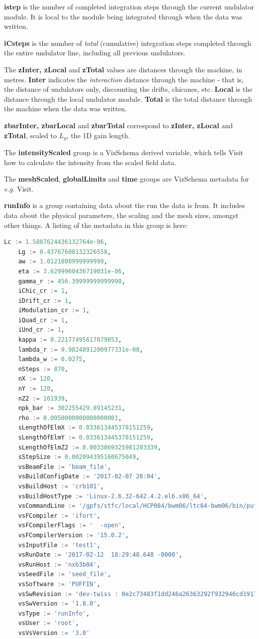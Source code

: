 \documentclass[12pt]{article}%
\begin{document}
{\bf istep} is the number of completed integration steps through the current undulator module. It is local to the module being integrated through when the data was written.

{\bf iCsteps} is the number of \textit{total} (cumulative) integration steps completed through the entire undulator line, including all previous undulators.

The {\bf zInter, zLocal} and {\bf zTotal} values are distances through the machine, in metres. {\bf Inter} indicates the \textit{interaction} distance through the machine - that is, the distance of undulators only, discounting the drifts, chicanes, etc. {\bf Local} is the distance through the local undulator module. {\bf Total} is the total distance through the machine when the data was written.

{\bf zbarInter, zbarLocal} and {\bf zbarTotal} correspond to {\bf zInter, zLocal} and {\bf zTotal}, scaled to $L_g$, the 1D gain length.


The {\bf intensityScaled} group is a VizSchema derived variable, which tells Visit how to calculate the intensity from the scaled field data.

The {\bf meshScaled}, {\bf globalLimits} and {\bf time} groups are VizSchema metadata for \textit{e.g.} Visit.

{\bf runInfo} is a group containing data about the run the data is from. It includes data about the physical parameters, the scaling and the mesh sizes, amongst other things. A listing of the metadata in this group is here:

\begin{lstlisting}[language=python]
    Lc := 1.5887624436132764e-06,
    Lg := 0.43767608132326558,
    aw := 1.0121808999999999,
    eta := 3.6299960436719031e-06,
    gamma_r := 456.39999999999998,
    iChic_cr := 1,
    iDrift_cr := 1,
    iModulation_cr := 1,
    iQuad_cr := 1,
    iUnd_cr := 1,
    kappa := 0.22177495617879053,
    lambda_r := 9.9824891200977331e-08,
    lambda_w := 0.0275,
    nSteps := 870,
    nX := 120,
    nY := 120,
    nZ2 := 161939,
    npk_bar := 302255429.89145231,
    rho := 0.0050000000000000001,
    sLengthOfElmX := 0.033613445378151259,
    sLengthOfElmY := 0.033613445378151259,
    sLengthOfElmZ2 := 0.0033069325981203339,
    sStepSize := 0.002094395160675049,
    vsBeamFile := 'beam_file',
    vsBuildConfigDate := '2017-02-07 20:04',
    vsBuildHost := 'crb101',
    vsBuildHostType := 'Linux-2.6.32-642.4.2.el6.x86_64',
    vsCommandLine := '/gpfs/stfc/local/HCP084/bwm06/ltc84-bwm06/bin/puffin-fftw3/bin/puffin test1.in',
    vsFCompiler := 'ifort',
    vsFCompilerFlags := '  -open',
    vsFCompilerVersion := '15.0.2',
    vsInputFile := 'test1',
    vsRunDate := '2017-02-12  18:29:48.648 -0000',
    vsRunHost := 'nxb3b04',
    vsSeedFile := 'seed_file',
    vsSoftware := 'PUFFIN',
    vsSwRevision := 'dev-twiss : 0e2c73483f1dd246a26363292f932946cd1917c8',
    vsSwVersion := '1.8.0',
    vsType := 'runInfo',
    vsUser := 'root',
    vsVsVersion := '3.0'
\end{lstlisting}
\end{document}
